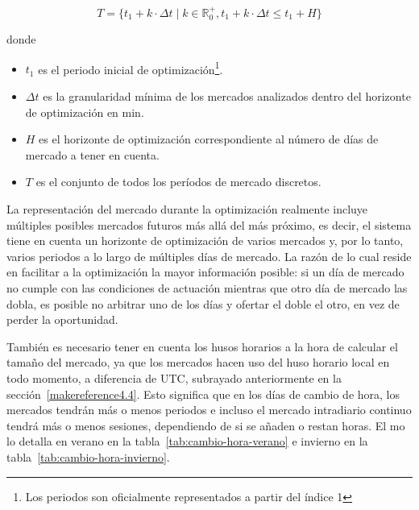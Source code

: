 \begin{samepage}

  \begin{equation}%
    \label{eq:set-mercado}
    T = \{t_{1} + k \cdot \Delta t \mid k \in \mathbb{R}^{+}_{0}, t_{1} + k \cdot \Delta t \leq t_{1} + H\}
  \end{equation}

  donde

  \begin{itemize}

    \item \( t_{1} \) es el periodo inicial de optimización\footnote{Los periodos son oficialmente representados a partir del índice 1}.

    \item \( \Delta t \) es la granularidad mínima de los mercados analizados dentro del horizonte de optimización en \si{\minute}.

    \item \( H \) es el horizonte de optimización correspondiente al número de días de mercado a tener en cuenta.

    \item \( T \) es el conjunto de todos los períodos de mercado discretos.

  \end{itemize}

\end{samepage}

La representación del mercado durante la optimización realmente incluye múltiples posibles mercados futuros más allá del más próximo, es decir, el sistema tiene en cuenta un horizonte de optimización de varios mercados y, por lo tanto, varios periodos a lo largo de múltiples días de mercado. La razón de lo cual reside en facilitar a la optimización la mayor información posible: si un día de mercado no cumple con las condiciones de actuación mientras que otro día de mercado las dobla, es posible no arbitrar uno de los días y ofertar el doble el otro, en vez de perder la oportunidad.

También es necesario tener en cuenta los husos horarios a la hora de calcular el tamaño del mercado, ya que los mercados hacen uso del huso horario local en todo momento, a diferencia de UTC, subrayado anteriormente en la sección~\ref{makereference4.4}. Esto significa que en los días de cambio de hora, los mercados  tendrán más o menos periodos e incluso el mercado intradiario continuo tendrá más o menos sesiones, dependiendo de si se añaden o restan horas. El \gls{mo} lo detalla en verano en la tabla~\ref{tab:cambio-hora-verano} e invierno en la tabla~\ref{tab:cambio-hora-invierno}.

